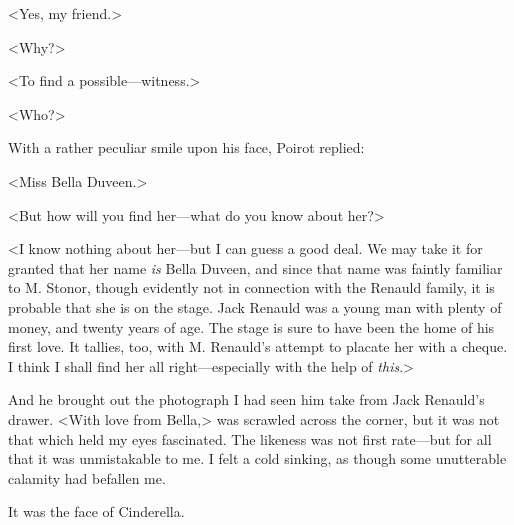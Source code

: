  <Yes, my friend.> 

 <Why?> 

 <To find a possible—witness.> 

 <Who?> 

 With a rather peculiar smile upon his face, Poirot replied: 

 <Miss Bella Duveen.> 

 <But how will you find her—what do you know about her?> 

 <I know nothing about her—but I can guess a good deal. We may take it for granted that her name \emph{is} Bella Duveen, and since that name was faintly familiar to M. Stonor, though evidently not in connection with the Renauld family, it is probable that she is on the stage. Jack Renauld was a young man with plenty of money, and twenty years of age. The stage is sure to have been the home of his first love. It tallies, too, with M. Renauld's attempt to placate her with a cheque. I think I shall find her all right—especially with the help of \emph{this}.> 

 And he brought out the photograph I had seen him take from Jack Renauld's drawer. <With love from Bella,> was scrawled across the corner, but it was not that which held my eyes fascinated. The likeness was not first rate—but for all that it was unmistakable to me. I felt a cold sinking, as though some unutterable calamity had befallen me. 

 It was the face of Cinderella.
